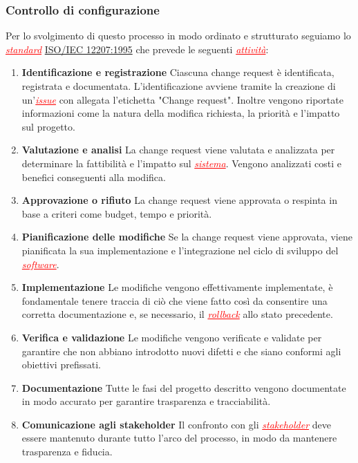 \subsubsection{Controllo di configurazione}
Per lo svolgimento di questo processo in modo ordinato e strutturato seguiamo lo \textcolor{red}{\uline{\textit{standard}}} \href{https://www.math.unipd.it/~tullio/IS-1/2009/Approfondimenti/ISO_12207-1995.pdf}{ISO/IEC 12207:1995}
che prevede le seguenti \textcolor{red}{\uline{\textit{attività}}}:
\begin{enumerate}
    \item \textbf{Identificazione e registrazione} Ciascuna change request è identificata, registrata e documentata. L'identificazione avviene
    tramite la creazione di un'\textcolor{red}{\uline{\textit{issue}}} con allegata l'etichetta "Change request".
    Inoltre vengono riportate informazioni come la natura della modifica richiesta, la priorità e l'impatto sul progetto.
    \item \textbf{Valutazione e analisi} La change request viene valutata e analizzata per determinare la fattibilità e l'impatto sul 
    \textcolor{red}{\uline{\textit{sistema}}}. Vengono analizzati costi e benefici conseguenti alla modifica.
    \item \textbf{Approvazione o rifiuto} La change request viene approvata o respinta in base a criteri come budget, tempo e priorità.
    \item \textbf{Pianificazione delle modifiche} Se la change request viene approvata, viene pianificata la sua implementazione e l'integrazione 
    nel ciclo di sviluppo del \textcolor{red}{\uline{\textit{software}}}.
    \item \textbf{Implementazione} Le modifiche vengono effettivamente implementate, è fondamentale tenere traccia di ciò che viene fatto così
    da consentire una corretta documentazione e, se necessario, il \textcolor{red}{\uline{\textit{rollback}}} allo stato precedente.
    \item \textbf{Verifica e validazione} Le modifiche vengono verificate e validate per garantire che non abbiano introdotto nuovi difetti
    e che siano conformi agli obiettivi prefissati.
    \item \textbf{Documentazione} Tutte le fasi del progetto descritto vengono documentate in modo accurato per garantire trasparenza e
    tracciabilità.
    \item \textbf{Comunicazione agli stakeholder} Il confronto con gli \textcolor{red}{\uline{\textit{stakeholder}}} deve essere mantenuto
    durante tutto l'arco del processo, in modo da mantenere trasparenza e fiducia.
\end{enumerate}

